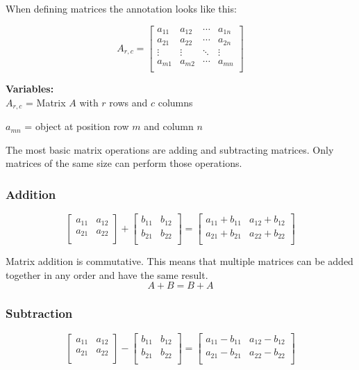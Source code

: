 When defining matrices the annotation looks like this:

\[
A_{r, c} = 
\begin{bmatrix}
a_{11} & a_{12} & \cdots & a_{1n} \\
a_{21} & a_{22} & \cdots & a_{2n} \\
\vdots & \vdots & \ddots & \vdots \\
a_{m1} & a_{m2} & \cdots & a_{mn} \\

\end{bmatrix}
\]

\textbf{Variables: } \\
$A_{r,c}$ = Matrix $A$ with $r$ rows and $c$ columns

$a_{mn}$ = object at position row $m$ and column $n$

The most basic matrix operations are adding and subtracting matrices. Only matrices of the same size can perform those operations.

\subsubsection{Addition}
\[
\begin{bmatrix}
a_{11} & a_{12} \\
a_{21} & a_{22} \\
\end{bmatrix}
+
\begin{bmatrix}
b_{11} & b_{12} \\
b_{21} & b_{22} \\
\end{bmatrix}
=
\begin{bmatrix}
a_{11} + b_{11} & a_{12}+b_{12} \\
a_{21} + b_{21} & a_{22}+b_{22} \\
\end{bmatrix}
\]

Matrix addition is commutative. This means that multiple matrices can be added together in any order and have the same result.\ \cite{Web:23}
\[
A + B = B + A
\]

\subsubsection{Subtraction}
\[
\begin{bmatrix}
a_{11} & a_{12} \\
a_{21} & a_{22} \\
\end{bmatrix}
-
\begin{bmatrix}
b_{11} & b_{12} \\
b_{21} & b_{22} \\
\end{bmatrix}
=
\begin{bmatrix}
a_{11} - b_{11} & a_{12}-b_{12} \\
a_{21} - b_{21} & a_{22}-b_{22} \\
\end{bmatrix}
\]

